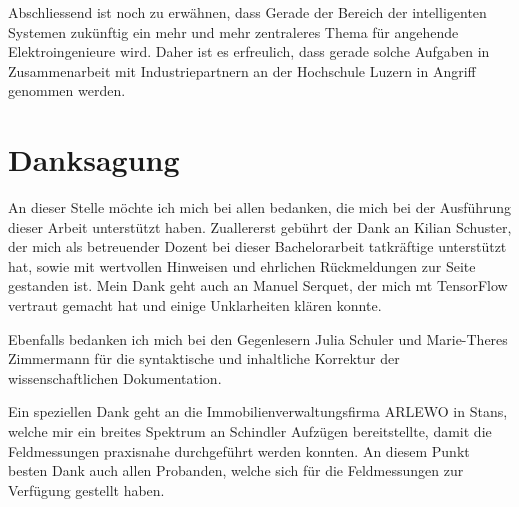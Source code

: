 Abschliessend ist noch zu erwähnen, dass   Gerade der Bereich der intelligenten Systemen zukünftig ein mehr und mehr zentraleres Thema für angehende Elektroingenieure wird. Daher ist es erfreulich, dass gerade solche Aufgaben in Zusammenarbeit mit Industriepartnern an der Hochschule Luzern in Angriff genommen werden.



  



\section{Danksagung}

An dieser Stelle möchte ich mich bei allen bedanken, die mich bei der Ausführung dieser
Arbeit unterstützt haben. 
Zuallererst gebührt der Dank an Kilian Schuster, der mich als betreuender Dozent bei dieser Bachelorarbeit tatkräftige unterstützt hat, sowie mit wertvollen Hinweisen und ehrlichen Rückmeldungen zur Seite gestanden ist. Mein Dank geht auch an Manuel Serquet, der mich mt TensorFlow vertraut gemacht hat und einige Unklarheiten klären konnte. 

Ebenfalls bedanken ich mich bei den Gegenlesern Julia Schuler und Marie-Theres Zimmermann für die syntaktische und inhaltliche Korrektur der wissenschaftlichen Dokumentation.

Ein speziellen Dank geht an die Immobilienverwaltungsfirma ARLEWO in Stans, welche mir ein breites Spektrum an Schindler Aufzügen bereitstellte, damit die Feldmessungen praxisnahe durchgeführt werden konnten. An diesem Punkt besten Dank auch allen Probanden, welche sich für die Feldmessungen zur Verfügung gestellt haben.